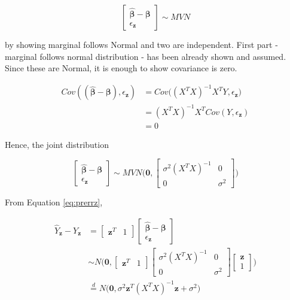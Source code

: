 \documentclass[]{book}
\theoremstyle{definition}
\theoremstyle{definition}
\theoremstyle{definition}
\theoremstyle{remark}
\begin{document}
\[
\begin{bmatrix}
  \boldsymbol{\hat\beta}- \boldsymbol\beta\\
  \epsilon_{\mathbf{z}}
\end{bmatrix} \sim MVN
\]

by showing marginal follows Normal and two are independent. First part - marginal follows normal distribution - has been already shown and assumed. Since these are Normal, it is enough to show covariance is zero.

\begin{equation*}
  \begin{split}
    Cov((\boldsymbol{\hat\beta}- \boldsymbol\beta), \epsilon_{\mathbf{z}}) & = Cov\Big( (X^TX)^{-1}X^T Y, \epsilon_{\mathbf{z}} \Big) \\
    & = (X^TX)^{-1}X^T Cov(Y, \epsilon_{\mathbf{z}}) \\
    & = 0
  \end{split}
\end{equation*}

Hence, the joint distribution

\[
\begin{bmatrix}
  \boldsymbol{\hat\beta}- \boldsymbol\beta\\ \hline
  \epsilon_{\mathbf{z}}
\end{bmatrix} \sim MVN\bigg( \mathbf{0}, \left[\begin{array}{c|c}
  \sigma^2(X^TX)^{-1} & 0 \\ \hline
  0 & \sigma^2
\end{array}\right] \bigg)
\]

From Equation \eqref{eq:prerrz},

\begin{equation*}
  \begin{split}
    \hat{Y}_{\mathbf{z}} - Y_{\mathbf{z}} & = \left[\begin{array}{c|c}
      \mathbf{z}^T & 1
    \end{array}\right] \begin{bmatrix}
      \boldsymbol{\hat\beta}- \boldsymbol\beta\\ \hline
      \epsilon_{\mathbf{z}}
    \end{bmatrix} \\
    & \sim N \Bigg( \mathbf{0}, \left[\begin{array}{c|c}
      \mathbf{z}^T & 1
    \end{array}\right] \left[\begin{array}{c|c}
      \sigma^2(X^TX)^{-1} & 0 \\ \hline
      0 & \sigma^2
    \end{array}\right] \left[\begin{array}{cc}
      \mathbf{z} \\ 1
    \end{array}\right] \Bigg) \\
    & \stackrel{d}{=} N \Big( \mathbf{0}, \sigma^2\mathbf{z}^T(X^TX)^{-1}\mathbf{z} + \sigma^2 \Big)
  \end{split}
\end{equation*}
\end{document}
